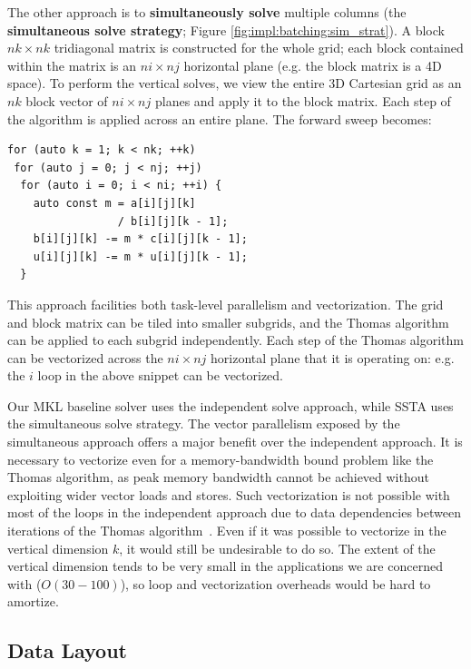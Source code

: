 \documentclass[10pt, conference, compsocconf]{IEEEtran}
\begin{document}
The other approach is to \textbf{simultaneously solve} multiple columns (the
  \textbf{simultaneous solve strategy}; Figure
  \ref{fig:impl:batching:sim_strat}).
A block \(nk \times nk\) tridiagonal matrix is constructed for the whole grid;
  each block contained within the matrix is an \(ni \times nj\) horizontal plane
  (e.g. the block matrix is a 4D space).
To perform the vertical solves, we view the entire 3D Cartesian grid as an
  \(nk\) block vector of \(ni \times nj\) planes and apply it to the block
  matrix.
Each step of the algorithm is applied across an entire plane.
The forward sweep becomes:
\begin{lstlisting}
for (auto k = 1; k < nk; ++k)
 for (auto j = 0; j < nj; ++j)
  for (auto i = 0; i < ni; ++i) {
    auto const m = a[i][j][k]
                 / b[i][j][k - 1];
    b[i][j][k] -= m * c[i][j][k - 1];
    u[i][j][k] -= m * u[i][j][k - 1];
  } 
\end{lstlisting}
This approach facilities both task-level parallelism and vectorization.
The grid and block matrix can be tiled into smaller subgrids, and the Thomas
  algorithm can be applied to each subgrid independently.
Each step of the Thomas algorithm can be vectorized across the \(ni \times nj\)
  horizontal plane that it is operating on: e.g. the \(i\) loop in the
  above snippet can be vectorized.

Our MKL baseline solver uses the independent solve approach, while SSTA uses
  the simultaneous solve strategy.
The vector parallelism exposed by the simultaneous approach offers a major
  benefit over the independent approach.
It is necessary to vectorize even for a memory-bandwidth bound problem like the
  Thomas algorithm, as peak memory bandwidth cannot be achieved without
  exploiting wider vector loads and stores.
Such vectorization is not possible with most of the loops in the independent
  approach due to data dependencies between iterations of the Thomas
  algorithm~\cite{pipelined_thomas_algorithm}.
Even if it was possible to vectorize in the vertical dimension \(k\), it would
  still be undesirable to do so.
The extent of the vertical dimension tends to be very small in the applications
  we are concerned with (\(O(30-100)\)), so loop and vectorization overheads
  would be hard to amortize.

\subsection{Data Layout}
\label{sec:impl:data_layout}
\end{document}
